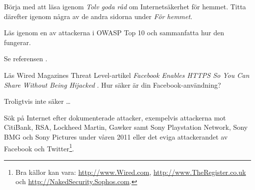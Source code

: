 \documentclass[11pt,a4paper]{miunasgn}
\begin{document}
\begin{questions}															   
	\question\label{q:PTS}
	Börja med att läsa igenom \emph{Tolv goda råd} \citep{PTStgr} om
	Internetsäkerhet för hemmet.
	Titta därefter igenom några av de andra sidorna under \emph{För hemmet}.

	\question
	\label{q:OWASPTopTen}
	Läs igenom en av attackerna i OWASP Top 10 \citep{OWASP2010ot} och
	sammanfatta hur den fungerar.
	\begin{solution}
		Se referensen \citet{OWASP2010ot}.
	\end{solution}

	\question
	Läs Wired Magazines Threat Level-artikel \emph{Facebook Enables HTTPS So
	You Can Share Without Being Hijacked} \citep{Singel2011feh}.
	Hur säker är din Facebook-användning?
	\begin{solution}
		Troligtvis inte säker \dots
	\end{solution}

	\question\label{q:Attack}
	Sök på Internet efter dokumenterade attacker, exempelvis attackerna mot
	CitiBank,
	RSA,
	Lockheed Martin,
	Gawker samt
	Sony Playstation Network,
	Sony BMG och
	Sony Pictures
	under våren 2011 eller det eviga attackerandet av
	Facebook och
	Twitter\footnote{%
		Bra källor kan vara:
			\url{http://www.Wired.com},
			\url{http://www.TheRegister.co.uk} och
			\url{http://NakedSecurity.Sophos.com}.
	}.
\end{questions}
\end{document}
